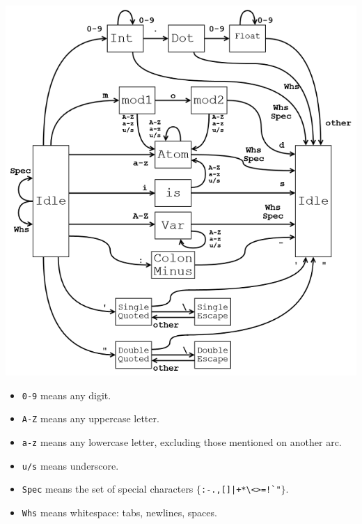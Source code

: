 \documentclass[12pt]{article}
\begin{document}
\newpage

\vspace{-50px}
\includegraphics{lex65.png}%

\vspace{-10px}
\begin{itemize}
\item \verb|0-9| means any digit.\vspace{-4px}
\item \verb|A-Z| means any uppercase letter.\vspace{-4px}
\item \verb|a-z| means any lowercase letter, excluding those mentioned on another arc.\vspace{-4px}
\item \verb|u/s| means underscore.\vspace{-4px}
\item \verb|Spec| means the set of special characters $\{$\verb/:-.,[]|+*\<>=!`"/$\}$.\vspace{-4px}
\item \verb|Whs| means whitespace: tabs, newlines, spaces.
\end{itemize}
\end{document}
